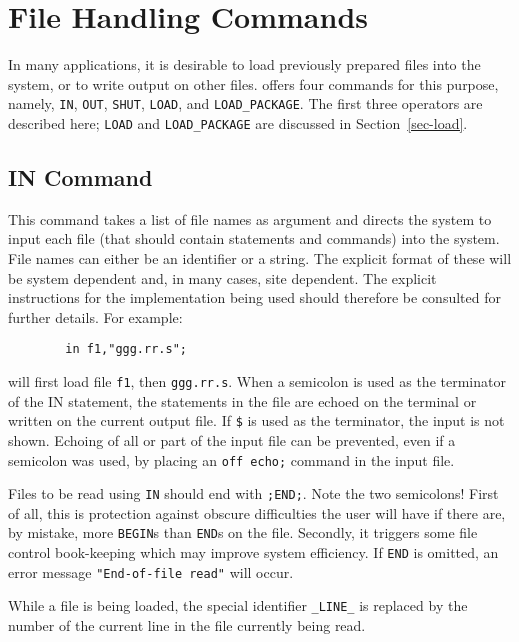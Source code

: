 \chapter{File Handling Commands}

In many applications, it is desirable to load previously prepared {\REDUCE}
files into the system, or to write output on other files. {\REDUCE} offers
four commands for this purpose, namely, \texttt{IN}, \texttt{OUT}, \texttt{SHUT},
\texttt{LOAD}, and \texttt{LOAD\_PACKAGE}.  
The first three operators are described here; \texttt{LOAD} and 
\texttt{LOAD\_PACKAGE} are discussed in Section~\ref{sec-load}.

\section{IN Command}
\hypertarget{command:IN}{}
\hypertarget{switch:ECHO}{}
\hypertarget{reserved:_LINE_}{}
This command takes a list of file names as argument and directs the system
to input each file (that should contain {\REDUCE} statements
and commands) into the system.  File names can either be an identifier or
a string.  The explicit format of these will be system dependent and, in
many cases, site dependent.  The explicit instructions for the
implementation being used should therefore be consulted for further
details. For example:
\begin{verbatim}
        in f1,"ggg.rr.s";
\end{verbatim}
will first load file \texttt{f1}, then \texttt{ggg.rr.s}.  When a semicolon is
used as the terminator of the IN statement, the statements in the file are
echoed on the terminal or written on the current output file.  If \texttt{\$}
 is used as the terminator, the input is not
shown.  Echoing of all or part of the input file can be prevented, even if
a semicolon was used, by placing an \texttt{off echo;} command
in the input file.

Files to be read using \texttt{IN} should end with \texttt{;END;}.  Note the two
semicolons!  First of all, this is protection against obscure difficulties
the user will have if there are, by mistake, more \texttt{BEGIN}s than
\texttt{END}s on the file.  Secondly, it triggers some file control book-keeping
which may improve system efficiency.  If \texttt{END} is omitted, an error
message \texttt{"End-of-file read"} will occur.

While a file is being loaded, the special identifier 
\texttt{\_LINE\_}
is replaced by the number of the current line in the file currently
being read.

